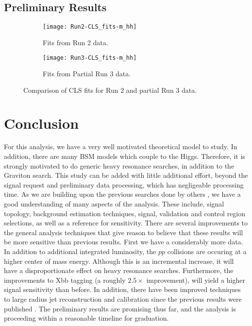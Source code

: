 \documentclass[12pt]{article}
\begin{document}
\lipsum[17-18]
\newpage
\clearpage

\subsection{Preliminary Results}
\begin{figure}[t]
    \centering
    \begin{subfigure}[t]{.48\textwidth}
        \centering
        \texttt{[image: Run2-CLS\_fits-m\_hh]}
        \caption{Fits from Run 2 data.}
        \label{subfig:cls-run2}
    \end{subfigure}
    \begin{subfigure}[t]{.48\textwidth}
        \centering
        \texttt{[image: Run3-CLS\_fits-m\_hh]}
        \caption{Fits from Partial Run 3 data.}
        \label{subfig:cls-run3}
    \end{subfigure}
\caption{Comparison of CLS fits for Run 2 and partial Run 3 data.}
\label{fig:cls_fit_results}
\end{figure}
\lipsum[20-21]

\section{Conclusion}
For this analysis, we have a very well motivated theoretical model to study. In
addition, there are many BSM models which couple to the Higgs. Therefore, it is
strongly motivated to do generic heavy resonance searches, in addition to the
Graviton search. This study can be added with little additional effort, beyond
the signal request and preliminary data processing, which has negligeable
processing time. As we are building upon the previous searches done by others
\cite{previous_results}, we have a good understanding of many aspects of the
analysis. These include, signal topology, background estimation techniques,
signal, validation and control region selections, as well as a reference for
sensitivity. There are several improvements to the general analysis techniques
that give reason to believe that these results will be more sensitive than
previous results. First we have a considerably more data. In addition to
additional integrated luminosity, the $pp$ collisions are occuring at a higher
center of mass energy. Although this is an incremental increase, it will have a
disproportionate effect on heavy resonance searches. Furthermore, the
improvements to Xbb tagging (a roughly $2.5\times$ improvement), will yield a
higher signal sensitivity than before. In addition, there have been improved
techniques to large radius jet reconstruction and calibration since the previous
results were published \cite{large_r_jet}. The preliminary results are promising
thus far, and the analysis is proceeding within a reasonable timeline for
graduation.
\end{document}
